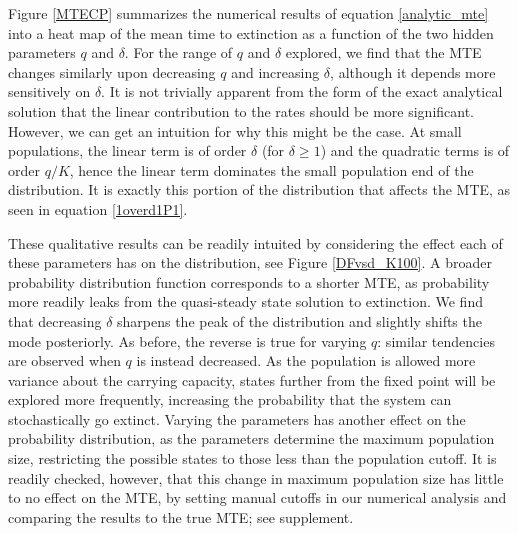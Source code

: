 Figure \ref{MTECP} summarizes the numerical results of equation \ref{analytic_mte} into a heat map of the mean time to extinction as a function of the two hidden parameters $q$ and $\delta$.
For the range of $q$ and $\delta$ explored, we find that the MTE changes similarly upon decreasing $q$ and increasing $\delta$, although it depends more sensitively on $\delta$. 
It is not trivially apparent from the form of the exact analytical solution that the linear contribution to the rates should be more significant. %
However, we can get an intuition for why this might be the case. 
At small populations, the linear term is of order $\delta$ (for $\delta \geq 1$) and the quadratic terms is of order $q/K$, hence the linear term dominates the small population end of the distribution. 
It is exactly this portion of the distribution that affects the MTE, as seen in equation \ref{1overd1P1}. 

These qualitative results can be readily intuited by considering the effect each of these parameters has on the distribution, see Figure \ref{DFvsd_K100}.
A broader probability distribution function corresponds to a shorter MTE, as probability more readily leaks from the quasi-steady state solution to extinction.
We find that decreasing $\delta$ sharpens the peak of the distribution and slightly shifts the mode posteriorly. 
As before, the reverse is true for varying $q$: similar tendencies are observed when $q$ is instead decreased.
As the population is allowed more variance about the carrying capacity, states further from the fixed point will be explored more frequently, increasing the probability that the system can stochastically go extinct. 
Varying the parameters has another effect on the probability distribution, as the parameters determine the maximum population size, restricting the possible states to those less than the population cutoff. 
It is readily checked, however, that this change in maximum population size has little to no effect on the MTE, by setting manual cutoffs in our numerical analysis and comparing the results to the true MTE; see supplement. 


